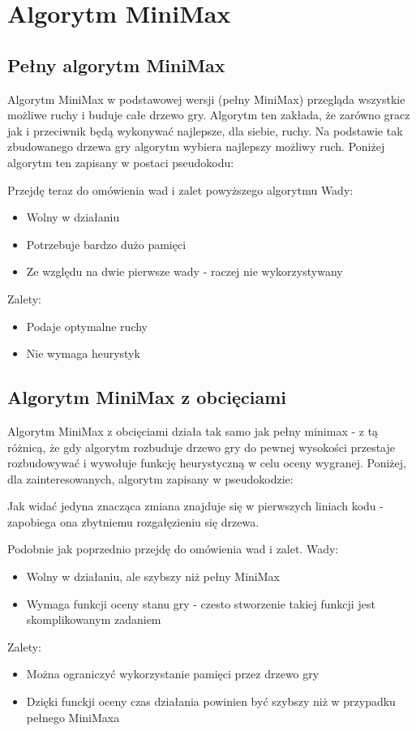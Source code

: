 \documentclass[declaration,shortabstract,inz]{iithesis}
\begin{document}
\section{Algorytm MiniMax}
\subsection{Pełny algorytm MiniMax}
Algorytm MiniMax w podstawowej wersji (pełny MiniMax) przegląda wszystkie możliwe ruchy i buduje całe drzewo gry.
Algorytm ten zakłada, że zarówno gracz jak i przeciwnik będą wykonywać najlepsze, dla siebie, ruchy.
Na podstawie tak zbudowanego drzewa gry algorytm wybiera najlepszy możliwy ruch.
Poniżej algorytm ten zapisany w postaci pseudokodu:

\newpage


Przejdę teraz do omówienia wad i zalet powyższego algorytmu
\newline Wady:
\begin{itemize}
  \item Wolny w działaniu
  \item Potrzebuje bardzo dużo pamięci
  \item Ze względu na dwie pierwsze wady - raczej nie wykorzystywany
\end{itemize}
Zalety:
\begin{itemize}
  \item Podaje optymalne ruchy
  \item Nie wymaga heurystyk
\end{itemize}



\subsection{Algorytm MiniMax z obcięciami}
Algorytm MiniMax z obcięciami działa tak samo jak pełny minimax - z tą różnicą, że gdy algorytm rozbuduje drzewo gry do pewnej wysokości przestaje rozbudowywać i wywołuje funkcję heurystyczną w celu oceny wygranej.
Poniżej, dla zainteresowanych, algorytm zapisany w pseudokodzie:

\newpage

Jak widać jedyna znacząca zmiana znajduje się w pierwszych liniach kodu - zapobiega ona zbytniemu rozgałęzieniu się drzewa.

Podobnie jak poprzednio przejdę do omówienia wad i zalet.
\newline Wady:
\begin{itemize}
  \item Wolny w działaniu, ale szybszy niż pełny MiniMax
  \item Wymaga funkcji oceny stanu gry - czesto stworzenie takiej funkcji jest skomplikowanym zadaniem
\end{itemize}
Zalety:
\begin{itemize}
  \item Można ograniczyć wykorzystanie pamięci przez drzewo gry
  \item Dzięki funckji oceny czas działania powinien być szybszy niż w przypadku pełnego MiniMaxa
\end{itemize}
\end{document}
